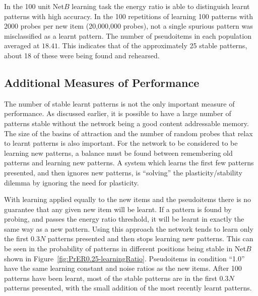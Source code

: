 In the 100 unit Net$B$ learning task the energy ratio is able to distinguish learnt patterns with high accuracy.  In the 100 repetitions of learning 100 patterns with 2000 probes per new item (20,000,000 probes), not a single spurious pattern was misclassified as a learnt pattern.  The number of pseudoitems in each population averaged at $18.41$.  This indicates that of the approximately 25 stable patterns, about 18 of these were being found and rehearsed.

\subsection{Additional Measures of Performance}

The number of stable learnt patterns is not the only important measure of performance.  As discussed earlier, it is possible to have a large number of patterns stable without the network being a good content addressable memory. The size of the basins of attraction and the number of random probes that relax to learnt patterns is also important. For the network to be considered to be learning new patterns, a balance must be found between remembering old patterns and learning new patterns.  A system which learns the first few patterns presented, and then ignores new patterns, is ``solving'' the plasticity/stability dilemma by ignoring the need for plasticity.

With learning applied equally to the new items and the pseudoitems there is no guarantee that any given new item will be learnt.  If a pattern is found by probing, and passes the energy ratio threshold, it will be learnt in exactly the same way as a new pattern.  Using this approach the network tends to learn only the first $0.3N$ patterns presented and then stops learning new patterns.  This can be seen in the probability of patterns in different positions being stable in Net$B$ shown in Figure~\ref{fig:PrER0.25-learningRatio}.  Pseudoitems in condition ``1.0'' have the same learning constant and noise ratios as the new items.  After 100 patterns have been learnt, most of the stable patterns are in the first $0.3N$ patterns presented, with the small addition of the most recently learnt patterns. 


